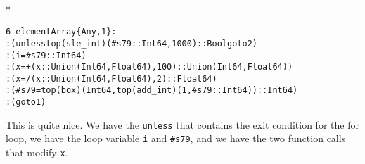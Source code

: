 \documentclass[letterpaper,10pt,english]{/usr/share/sphinx/texinputs/sphinxhowto}
\def\smaller{\fontsize{9.5pt}{9.5pt}\selectfont}
\newenvironment{InvisibleVerbatim}
        {\begin{mdframed}[leftmargin=0.1\linewidth,innerleftmargin=3pt,innerrightmargin=3pt, userdefinedwidth=1\linewidth, linewidth=0pt, linecolor=white, usetwoside=false]}
        {\end{mdframed}}
\begin{document}
                \makebox[0.1\linewidth]{\smaller\hfill\tt\color{nbframe-out-prompt}Out\hspace{4pt}{[}45{]}:\hspace{4pt}}\\*
                \vspace{-2.55\baselineskip}\begin{InvisibleVerbatim}
                \vspace{-0.5\baselineskip}
\begin{alltt}6-element Array\{Any,1\}:
 :(unless top(sle\_int)(\#s79::Int64,1000)::Bool goto 2)
 :(i = \#s79::Int64)
 :(x = +(x::Union(Int64,Float64),100)::Union(Int64,Float64))
 :(x = /(x::Union(Int64,Float64),2)::Float64)
 :(\#s79 = top(box)(Int64,top(add\_int)(1,\#s79::Int64))::Int64)
 :(goto 1)\end{alltt}

            \end{InvisibleVerbatim}
            
        
    
This is quite nice. We have the \texttt{unless} that contains the exit
condition for the for loop, we have the loop variable \texttt{i} and
\texttt{\#s79}, and we have the two function calls that modify
\texttt{x}.

\end{document}
